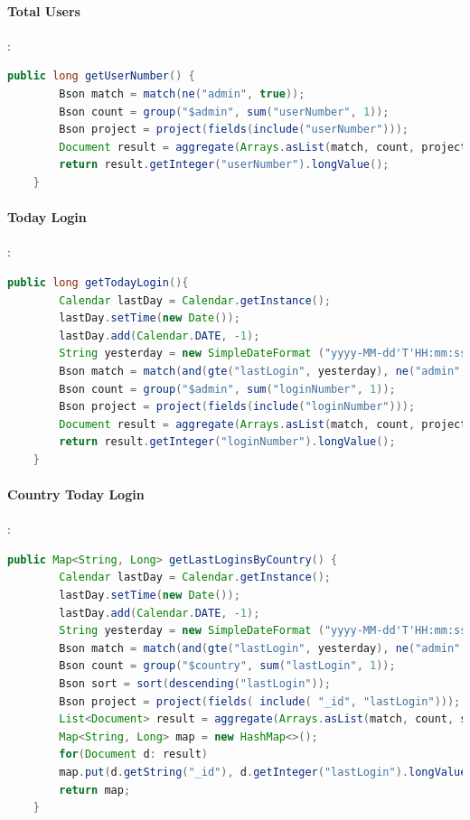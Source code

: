 \paragraph{Total Users}:
\begin{lstlisting}[language=Java]
	public long getUserNumber() {
		Bson match = match(ne("admin", true));
		Bson count = group("$admin", sum("userNumber", 1));
		Bson project = project(fields(include("userNumber")));
		Document result = aggregate(Arrays.asList(match, count, project)).get(0);
		return result.getInteger("userNumber").longValue();
	}
\end{lstlisting}
\paragraph{Today Login}:

\begin{lstlisting}[language=Java]
	public long getTodayLogin(){
		Calendar lastDay = Calendar.getInstance();
		lastDay.setTime(new Date());
		lastDay.add(Calendar.DATE, -1);
		String yesterday = new SimpleDateFormat ("yyyy-MM-dd'T'HH:mm:ss.SSS'Z'", Locale.US).format(lastDay.getTime());
		Bson match = match(and(gte("lastLogin", yesterday), ne("admin", true)));
		Bson count = group("$admin", sum("loginNumber", 1));
		Bson project = project(fields(include("loginNumber")));
		Document result = aggregate(Arrays.asList(match, count, project)).get(0);
		return result.getInteger("loginNumber").longValue();
	}
\end{lstlisting}

\paragraph{Country Today Login}:
\begin{lstlisting}[language=Java]
	public Map<String, Long> getLastLoginsByCountry() {
		Calendar lastDay = Calendar.getInstance();
		lastDay.setTime(new Date());
		lastDay.add(Calendar.DATE, -1);
		String yesterday = new SimpleDateFormat ("yyyy-MM-dd'T'HH:mm:ss.SSS'Z'", Locale.US).format(lastDay.getTime());
		Bson match = match(and(gte("lastLogin", yesterday), ne("admin", true)));
		Bson count = group("$country", sum("lastLogin", 1));
		Bson sort = sort(descending("lastLogin"));
		Bson project = project(fields( include( "_id", "lastLogin")));
		List<Document> result = aggregate(Arrays.asList(match, count, sort, project));
		Map<String, Long> map = new HashMap<>();
		for(Document d: result)
		map.put(d.getString("_id"), d.getInteger("lastLogin").longValue());
		return map;
	}
\end{lstlisting}

